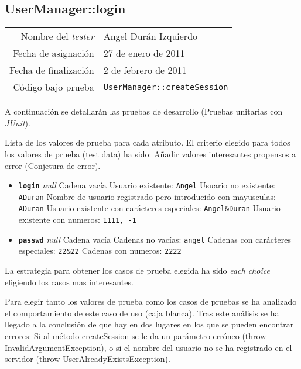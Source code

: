 \subsection{UserManager::login}

{\small
\begin{tabular}{r|l}
Nombre del \textit{tester} & Angel Durán Izquierdo \\
Fecha de asignación & 27 de enero de 2011 \\
Fecha de finalización & 2 de febrero de 2011 \\
Código bajo prueba & \texttt{UserManager::createSession}
\end{tabular}
}

A continuación se detallarán las pruebas de desarrollo (Pruebas unitarias con \textit{JUnit}).

Lista de los valores de prueba para cada atributo.
El criterio elegido para todos los valores de prueba (test data) ha sido: Añadir valores interesantes propensos a error (Conjetura de error).

\begin{itemize}
\item \textbf{\texttt{login}}
\subitem \textit{null}
\subitem Cadena vacía
\subitem Usuario existente: \texttt{Angel}
\subitem Usuario no existente: \texttt{ADuran}
\subitem Nombre de usuario registrado pero introducido con mayusculas: \texttt{ADuran}
\subitem Usuario existente con carácteres especiales: \texttt {Angel\&Duran}
\subitem Usuario existente con numeros: \texttt{1111, -1}

\item \textbf{\texttt{passwd}}
\subitem \textit{null}
\subitem Cadena vacía
\subitem Cadenas no vacías: \texttt{angel}
\subitem Cadenas con carácteres especiales: \texttt{22\&22}
\subitem Cadenas con numeros: \texttt{2222}

\end{itemize}

La estrategia para obtener los casos de prueba elegida ha sido
\textit{each choice} eligiendo los casos mas interesantes.

Para elegir tanto los valores de prueba como los casos de pruebas se ha analizado el comportamiento de este caso de uso (caja blanca). Tras este análisis se ha llegado a la conclusión de que hay en dos lugares en los que se pueden encontrar errores: Si al método createSession se le da un parámetro erróneo (throw InvalidArgumentException), o si el nombre del usuario no se ha registrado en el servidor (throw UserAlreadyExistsException).

